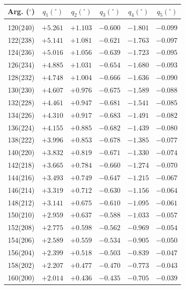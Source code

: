 \clearpage
\begin{table}[!h]
\vspace{0.25cm}
\centering
 \begin{tabular}{crrrrr}
Arg. ($^\circ$) & $q_1(^\circ)$  & $q_2(^\circ)$ & $q_3(^\circ)$ & $q_4(^\circ)$  & $q_5(^\circ)$  \\\hline
&&&&&\\[-1.75ex]
120(240) & $+5.261$ & $+1.103$ & $-0.600$ & $-1.801$ & $-0.099$\\
122(238) & $+5.141$ & $+1.081$ & $-0.621$ & $-1.763$ & $-0.097$\\
124(236) & $+5.016$ & $+1.056$ & $-0.639$ & $-1.723$ & $-0.095$\\
126(234) & $+4.885$ & $+1.031$ & $-0.654$ & $-1.680$ & $-0.093$\\
128(232) & $+4.748$ & $+1.004$ & $-0.666$ & $-1.636$ & $-0.090$\\
130(230) & $+4.607$ & $+0.976$ & $-0.675$ & $-1.589$ & $-0.088$\\
132(228) & $+4.461$ & $+0.947$ & $-0.681$ & $-1.541$ & $-0.085$\\
134(226) & $+4.310$ & $+0.917$ & $-0.683$ & $-1.491$ & $-0.082$\\
136(224) & $+4.155$ & $+0.885$ & $-0.682$ & $-1.439$ & $-0.080$\\
138(222) & $+3.996$ & $+0.853$ & $-0.678$ & $-1.385$ & $-0.077$\\
140(220) & $+3.832$ & $+0.819$ & $-0.671$ & $-1.330$ & $-0.074$\\
142(218) & $+3.665$ & $+0.784$ & $-0.660$ & $-1.274$ & $-0.070$\\
144(216) & $+3.493$ & $+0.749$ & $-0.647$ & $-1.215$ & $-0.067$\\
146(214) & $+3.319$ & $+0.712$ & $-0.630$ & $-1.156$ & $-0.064$\\
148(212) & $+3.141$ & $+0.675$ & $-0.610$ & $-1.095$ & $-0.061$\\
150(210) & $+2.959$ & $+0.637$ & $-0.588$ & $-1.033$ & $-0.057$\\
152(208) & $+2.775$ & $+0.598$ & $-0.562$ & $-0.969$ & $-0.054$\\
154(206) & $+2.589$ & $+0.559$ & $-0.534$ & $-0.905$ & $-0.050$\\
156(204) & $+2.399$ & $+0.518$ & $-0.503$ & $-0.839$ & $-0.047$\\
158(202) & $+2.207$ & $+0.477$ & $-0.470$ & $-0.773$ & $-0.043$\\
160(200) & $+2.014$ & $+0.436$ & $-0.435$ & $-0.705$ & $-0.039$\\

\end{tabular}
\end{table}
